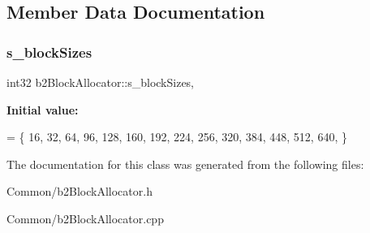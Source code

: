 \subsection{Member Data Documentation}
\mbox{\label{classb2BlockAllocator_a235f8511a784d4a5611ce45b86057ced}} 
\subsubsection{\texorpdfstring{s\+\_\+block\+Sizes}{s\_blockSizes}}
{\footnotesize\ttfamily int32 b2\+Block\+Allocator\+::s\+\_\+block\+Sizes\hspace{0.3cm}{\ttfamily [static]}, {\ttfamily [private]}}

{\bfseries Initial value\+:}
\begin{DoxyCode}
= 
\{
    16,     
    32,     
    64,     
    96,     
    128,    
    160,    
    192,    
    224,    
    256,    
    320,    
    384,    
    448,    
    512,    
    640,    
\}
\end{DoxyCode}


The documentation for this class was generated from the following files\+:\begin{DoxyCompactItemize}
\item 
Common/b2\+Block\+Allocator.\+h\item 
Common/b2\+Block\+Allocator.\+cpp\end{DoxyCompactItemize}
